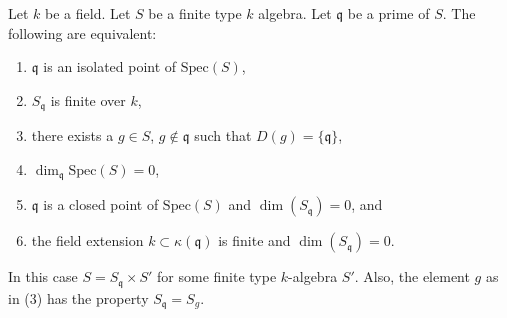 \begin{lemma}
\label{lemma-isolated-point}
Let $k$ be a field.
Let $S$ be a finite type $k$ algebra.
Let $\mathfrak q$ be a prime of $S$.
The following are equivalent:
\begin{enumerate}
\item $\mathfrak q$ is an isolated point of $\text{Spec}(S)$,
\item $S_{\mathfrak q}$ is finite over $k$,
\item there exists a $g \in S$, $g \not\in \mathfrak q$ such that
$D(g) = \{ \mathfrak q \}$,
\item $\dim_{\mathfrak q} \text{Spec}(S) = 0$,
\item $\mathfrak q$ is a closed point of $\text{Spec}(S)$ and
$\dim(S_{\mathfrak q}) = 0$, and
\item the field extension $k \subset \kappa(\mathfrak q)$ is finite
and $\dim(S_{\mathfrak q}) = 0$.
\end{enumerate}
In this case $S = S_{\mathfrak q} \times S'$ for some
finite type $k$-algebra $S'$. Also, the element $g$
as in (3) has the property $S_{\mathfrak q} = S_g$.
\end{lemma}

